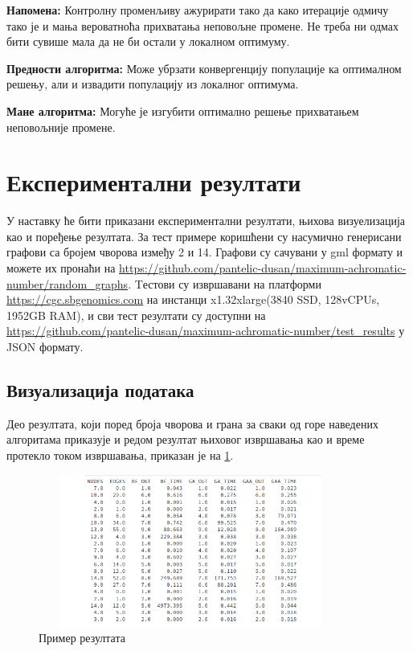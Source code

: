 \documentclass[a4paper]{article}
\begin{document}
{\textbf{Напомена:} Контролну променљиву ажурирати тако да како итерације одмичу тако је и мања вероватноћа прихватања неповољне промене. Не треба ни одмах бити сувише мала да не би остали у локалном оптимуму.

\textbf{Предности алгоритма:} Може убрзати конвергенцију популације ка оптималном решењу, али и извадити популацију из локалног оптимума.

\textbf{Мане алгоритма:} Могуће је изгубити оптимално решење прихватањем неповољније промене.

\section{Експериментални резултати}
\label{sec:experimet-results}
У наставку ће бити приказани експериментални резултати, њихова визуелизација као и поређење резултата. За тест примере коришћени су насумично генерисани графови са бројем чворова између 2 и 14. Графови су сачувани у gml формату и можете их пронаћи на \url{https://github.com/pantelic-dusan/maximum-achromatic-number/random_graphs}. Tестови су извршавани на платформи \url{https://cgc.sbgenomics.com} на инстанци x1.32xlarge(3840 SSD, 128vCPUs, 1952GB RAM), и сви тест резултати су доступни на \url{https://github.com/pantelic-dusan/maximum-achromatic-number/test_results} у JSON формату.

\subsection{Визуализација података}
Део резултата, који поред броја чворова и грана за сваки од горе наведених алгоритама приказује и редом резултат њиховог извршавања као и време протекло током извршавања, приказан је на \ref{data_view}.

\begin{figure}[h!]
	\centering
	\includegraphics[width=10cm, height=5cm]{images/data_view.png}
	\caption{Пример резултата}
	\label{data_view}
\end{figure}

}
\end{document}
